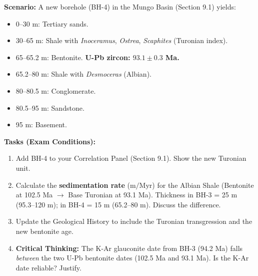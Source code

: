 \documentclass[11pt]{article}
\begin{document}
\begin{exercice}
\textbf{Scenario:} A new borehole (BH-4) in the Mungo Basin (Section 9.1) yields:
\begin{itemize}
    \item 0--30 m: Tertiary sands.
    \item 30--65 m: Shale with \emph{Inoceramus}, \emph{Ostrea}, \emph{Scaphites} (Turonian index).
    \item 65--65.2 m: Bentonite. \textbf{U-Pb zircon: $93.1 \pm 0.3$ Ma.}
    \item 65.2--80 m: Shale with \emph{Desmoceras} (Albian).
    \item 80--80.5 m: Conglomerate.
    \item 80.5--95 m: Sandstone.
    \item 95 m: Basement.
\end{itemize}
\textbf{Tasks (Exam Conditions):}
\begin{enumerate}
    \item Add BH-4 to your Correlation Panel (Section 9.1). Show the new Turonian unit.
    \item Calculate the \textbf{sedimentation rate} ($\mathrm{m/Myr}$) for the Albian Shale (Bentonite at 102.5 Ma $\rightarrow$ Base Turonian at 93.1 Ma). Thickness in BH-3 = 25 m (95.3--120 m); in BH-4 = 15 m (65.2--80 m). Discuss the difference.
    \item Update the Geological History to include the Turonian transgression and the new bentonite age.
    \item \textbf{Critical Thinking:} The K-Ar glauconite date from BH-3 (94.2 Ma) falls \emph{between} the two U-Pb bentonite dates (102.5 Ma and 93.1 Ma). Is the K-Ar date reliable? Justify.
\end{enumerate}
\end{exercice}
\end{document}
